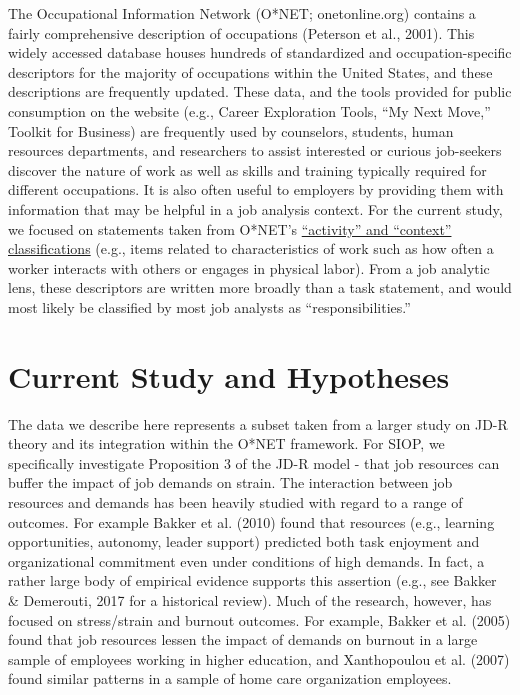 \documentclass[
  english,
  man]{apa6}
\begin{document}
The Occupational Information Network (O*NET; onetonline.org) contains a fairly comprehensive description of occupations (Peterson et al., 2001). This widely accessed database houses hundreds of standardized and occupation-specific descriptors for the majority of occupations within the United States, and these descriptions are frequently updated. These data, and the tools provided for public consumption on the website (e.g., Career Exploration Tools, ``My Next Move,'' Toolkit for Business) are frequently used by counselors, students, human resources departments, and researchers to assist interested or curious job-seekers discover the nature of work as well as skills and training typically required for different occupations. It is also often useful to employers by providing them with information that may be helpful in a job analysis context. For the current study, we focused on statements taken from O*NET's \href{https://www.O*NETonline.org/find/descriptor/result/4.A.1.b.3}{``activity'' and ``context'' classifications} (e.g., items related to characteristics of work such as how often a worker interacts with others or engages in physical labor). From a job analytic lens, these descriptors are written more broadly than a task statement, and would most likely be classified by most job analysts as ``responsibilities.''

\hypertarget{current-study-and-hypotheses}{%
\section{Current Study and Hypotheses}\label{current-study-and-hypotheses}}

The data we describe here represents a subset taken from a larger study on JD-R theory and its integration within the O*NET framework. For SIOP, we specifically investigate Proposition 3 of the JD-R model - that job resources can buffer the impact of job demands on strain. The interaction between job resources and demands has been heavily studied with regard to a range of outcomes. For example Bakker et al. (2010) found that resources (e.g., learning opportunities, autonomy, leader support) predicted both task enjoyment and organizational commitment even under conditions of high demands. In fact, a rather large body of empirical evidence supports this assertion (e.g., see Bakker \& Demerouti, 2017 for a historical review). Much of the research, however, has focused on stress/strain and burnout outcomes. For example, Bakker et al. (2005) found that job resources lessen the impact of demands on burnout in a large sample of employees working in higher education, and Xanthopoulou et al. (2007) found similar patterns in a sample of home care organization employees.
\end{document}

